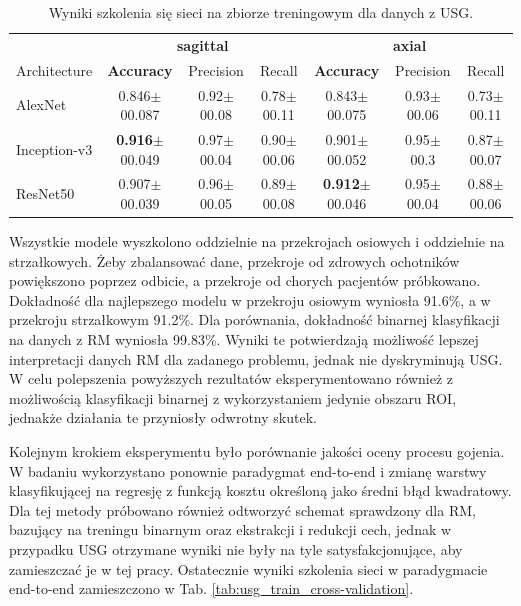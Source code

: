 \begin{table}[t!]
	\scriptsize
	\centering
	\setlength{\tabcolsep}{3pt}
	\setlength\extrarowheight{2pt}
	\caption{Wyniki szkolenia się sieci na zbiorze treningowym dla danych z USG.}
	\label{tab:usg-binary}
	\begin{tabular}{l||c|c|c||c|c|c}
		& \multicolumn{3}{c}{\footnotesize{\textbf{sagittal}}} & \multicolumn{3}{c}{\footnotesize{\textbf{axial}}} \\
		Architecture & \textbf{Accuracy} & Precision & Recall & \textbf{Accuracy} & Precision & Recall \\ \hline
		AlexNet & 0.846$\pm$00.087 & 0.92$\pm$00.08 & 0.78$\pm$00.11 & 0.843$\pm$00.075 & 0.93$\pm$00.06 & 0.73$\pm$00.11  \\ \hline
		Inception-v3 & \textbf{0.916}$\pm$00.049 & 0.97$\pm$00.04 & 0.90$\pm$00.06 & 0.901$\pm$00.052 & 0.95$\pm$00.3 & 0.87$\pm$00.07 \\ \hline
		ResNet50 & 0.907$\pm$00.039 & 0.96$\pm$00.05 & 0.89$\pm$00.08 & \textbf{0.912}$\pm$00.046 & 0.95$\pm$00.04 & 0.88$\pm$00.06 \\ \hline
	\end{tabular}
\end{table}

Wszystkie modele wyszkolono oddzielnie na przekrojach osiowych i oddzielnie na strzałkowych. Żeby zbalansować dane, przekroje od zdrowych ochotników powiększono poprzez odbicie, a przekroje od chorych pacjentów próbkowano. Dokładność dla najlepszego modelu w przekroju osiowym wyniosła 91.6\%, a w przekroju strzałkowym 91.2\%. Dla porównania, dokładność binarnej klasyfikacji na danych z RM wyniosła 99.83\%. Wyniki te potwierdzają możliwość lepszej interpretacji danych RM dla zadanego problemu, jednak nie dyskryminują USG. W celu polepszenia powyższych rezultatów eksperymentowano również z możliwością klasyfikacji binarnej z wykorzystaniem jedynie obszaru ROI, jednakże działania te przyniosły odwrotny skutek.  

Kolejnym krokiem eksperymentu było porównanie jakości oceny procesu gojenia. W badaniu wykorzystano ponownie paradygmat end-to-end i zmianę warstwy klasyfikującej na regresję z funkcją kosztu określoną jako średni błąd kwadratowy. Dla tej metody próbowano również odtworzyć schemat sprawdzony dla RM, bazujący na treningu binarnym oraz ekstrakcji i redukcji cech, jednak w przypadku USG otrzymane wyniki nie były na tyle satysfakcjonujące, aby zamieszczać je w tej pracy. Ostatecznie wyniki szkolenia sieci w paradygmacie end-to-end zamieszczono w Tab. \ref{tab:usg_train_cross-validation}.

